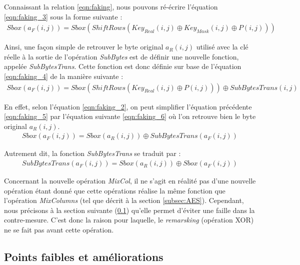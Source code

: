 \documentclass[oneside]{book}
\begin{document}
\hspace{-0.5cm}Connaissant la relation \ref{eqn:faking}, nous pouvons ré-écrire l'équation \ref{eqn:faking_3} sous la forme suivante : 
\begin{gather}
	Sbox(a_{F}(i,j)) = Sbox(ShiftRows(Key_{Real}(i,j) \oplus Key_{Mask}(i,j) \oplus P(i,j)))\label{eqn:faking_4}
\end{gather}

\hspace{-0.5cm}Ainsi, une façon simple de retrouver le byte original $a_{R}(i,j)$ utilisé avec la clé réelle à la sortie de l'opération \textit{SubBytes} est de définir une nouvelle fonction, appelée \textit{SubBytesTrans}. Cette fonction est donc définie sur base de l'équation \ref{eqn:faking_4} de la manière suivante : 
\begin{gather}
	Sbox(a_{F}(i,j)) = Sbox(ShiftRows(Key_{Real}(i,j) \oplus P(i,j))) \oplus SubBytesTrans(i,j)\label{eqn:faking_5}
\end{gather}

\hspace{-0.5cm}En effet, selon l'équation \ref{eqn:faking_2}, on peut simplifier l'équation précédente \ref{eqn:faking_5} par l'équation suivante \ref{eqn:faking_6} où l'on retrouve bien le byte original $a_{R}(i,j)$.
\begin{gather}
	Sbox(a_{F}(i,j)) = Sbox(a_{R}(i,j)) \oplus SubBytesTrans(a_{F}(i,j))\label{eqn:faking_6}
\end{gather}

\hspace{-0.5cm}Autrement dit, la fonction \textit{SubBytesTrans} se traduit par :
\begin{gather}
	SubBytesTrans(a_{F}(i,j)) = Sbox(a_{R}(i,j))  \oplus Sbox(a_{F}(i,j)) \label{eqn:faking_7}
\end{gather}

\hspace{-0.5cm}Concernant la nouvelle opération \textit{MixCol}, il ne s'agit en réalité pas d'une nouvelle opération étant donné que cette opérations réalise la même fonction que l'opération \textit{MixColumns} (tel que décrit à la section \ref{subsec:AES}). Cependant, nous précisons à la section suivante (\ref{subsec:points}) qu'elle permet d'éviter une faille dans la contre-mesure. C'est donc la raison pour laquelle, le \textit{remarsking} (opération XOR) ne se fait pas avant cette opération.

\subsection{Points faibles et améliorations}
\label{subsec:points}
\end{document}
